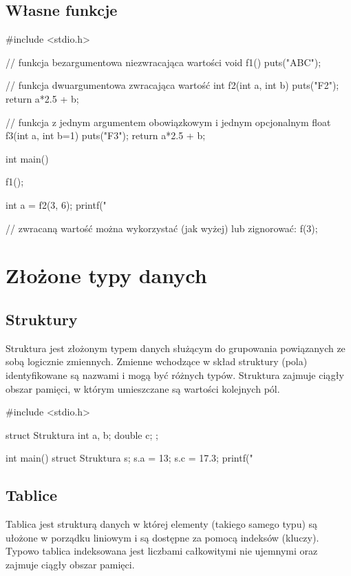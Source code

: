 
\subsection{Własne funkcje}

\begin{CodeFrame*}[c]{}
#include <stdio.h>

// funkcja bezargumentowa niezwracająca wartości
void f1() {
    puts("ABC");
}

// funkcja dwuargumentowa zwracająca wartość
int f2(int a, int b) {
    puts("F2");
    return a*2.5 + b;
}

// funkcja z jednym argumentem obowiązkowym i jednym opcjonalnym
float f3(int a, int b=1) {
	puts("F3");
	return a*2.5 + b;
}

int main() {
    f1();
    
    int a = f2(3, 6);
    printf("%
    
    // zwracaną wartość można wykorzystać (jak wyżej) lub zignorować:
    f(3);
}
\end{CodeFrame*}

\section{Złożone typy danych}

\subsection{Struktury}
Struktura jest złożonym typem danych służącym do grupowania powiązanych ze sobą logicznie zmiennych. Zmienne wchodzące w skład struktury (pola) identyfikowane są nazwami i mogą być różnych typów. Struktura zajmuje ciągły obszar pamięci, w którym umieszczane są wartości kolejnych pól.

\begin{CodeFrame*}[c]{}
#include <stdio.h>

struct Struktura {
    int a, b;
    double c;
};

int main() {
    struct Struktura s;
    s.a = 13;
    s.c = 17.3;
    printf("%
}
\end{CodeFrame*}

\subsection{Tablice}
Tablica jest strukturą danych w której elementy (takiego samego typu) są ułożone w porządku liniowym i są dostępne za pomocą indeksów (kluczy). Typowo tablica indeksowana jest liczbami całkowitymi nie ujemnymi oraz zajmuje ciągły obszar pamięci.

